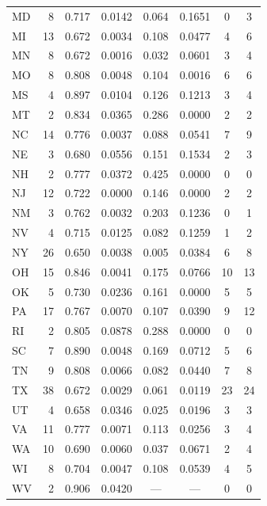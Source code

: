 \begin{longtable}{l r cccc cc}
MD & 8 & 0.717 & 0.0142 & 0.064 & 0.1651 & 0 & 3 \\
MI & 13 & 0.672 & 0.0034 & 0.108 & 0.0477 & 4 & 6 \\
MN & 8 & 0.672 & 0.0016 & 0.032 & 0.0601 & 3 & 4 \\
MO & 8 & 0.808 & 0.0048 & 0.104 & 0.0016 & 6 & 6 \\
MS & 4 & 0.897 & 0.0104 & 0.126 & 0.1213 & 3 & 4 \\
MT & 2 & 0.834 & 0.0365 & 0.286 & 0.0000 & 2 & 2 \\
NC & 14 & 0.776 & 0.0037 & 0.088 & 0.0541 & 7 & 9 \\
NE & 3 & 0.680 & 0.0556 & 0.151 & 0.1534 & 2 & 3 \\
NH & 2 & 0.777 & 0.0372 & 0.425 & 0.0000 & 0 & 0 \\
NJ & 12 & 0.722 & 0.0000 & 0.146 & 0.0000 & 2 & 2 \\
NM & 3 & 0.762 & 0.0032 & 0.203 & 0.1236 & 0 & 1 \\
NV & 4 & 0.715 & 0.0125 & 0.082 & 0.1259 & 1 & 2 \\
NY & 26 & 0.650 & 0.0038 & 0.005 & 0.0384 & 6 & 8 \\
OH & 15 & 0.846 & 0.0041 & 0.175 & 0.0766 & 10 & 13 \\
OK & 5 & 0.730 & 0.0236 & 0.161 & 0.0000 & 5 & 5 \\
PA & 17 & 0.767 & 0.0070 & 0.107 & 0.0390 & 9 & 12 \\
RI & 2 & 0.805 & 0.0878 & 0.288 & 0.0000 & 0 & 0 \\
SC & 7 & 0.890 & 0.0048 & 0.169 & 0.0712 & 5 & 6 \\
TN & 9 & 0.808 & 0.0066 & 0.082 & 0.0440 & 7 & 8 \\
TX & 38 & 0.672 & 0.0029 & 0.061 & 0.0119 & 23 & 24 \\
UT & 4 & 0.658 & 0.0346 & 0.025 & 0.0196 & 3 & 3 \\
VA & 11 & 0.777 & 0.0071 & 0.113 & 0.0256 & 3 & 4 \\
WA & 10 & 0.690 & 0.0060 & 0.037 & 0.0671 & 2 & 4 \\
WI & 8 & 0.704 & 0.0047 & 0.108 & 0.0539 & 4 & 5 \\
WV & 2 & 0.906 & 0.0420 & --- & --- & 0 & 0 \\
\end{longtable}
